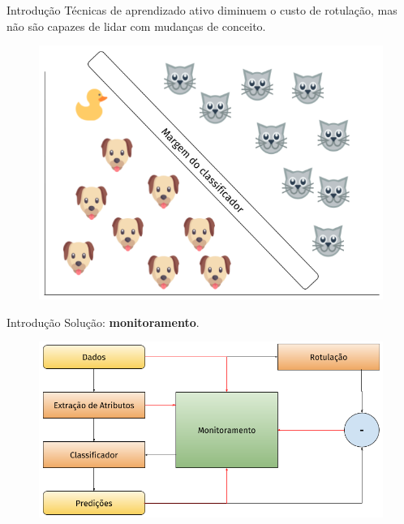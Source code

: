 \documentclass[10pt]{beamer}
\begin{document}
\begin{frame}{Introdução}
    Técnicas de aprendizado ativo diminuem o custo de rotulação, mas não são capazes de lidar com mudanças de conceito.

    \begin{figure}[H]
        \begin{center}
            \includegraphics[scale=0.45]{active_learning.png}
        \end{center}
    \end{figure}
\end{frame}

\begin{frame}{Introdução}
    Solução: \textbf{monitoramento}.
    
    \begin{figure}[H]
        \begin{center}
            \includegraphics[scale=0.45]{solucao_melhor.png}
        \end{center}
    \end{figure}
\end{frame}
\end{document}
